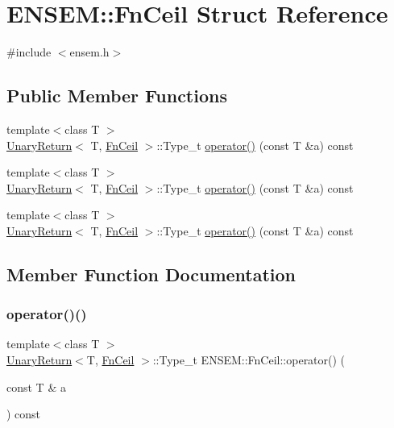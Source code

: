 \hypertarget{structENSEM_1_1FnCeil}{}\section{E\+N\+S\+EM\+:\+:Fn\+Ceil Struct Reference}
\label{structENSEM_1_1FnCeil}


{\ttfamily \#include $<$ensem.\+h$>$}

\subsection*{Public Member Functions}
\begin{DoxyCompactItemize}
\item 
{\footnotesize template$<$class T $>$ }\\\mbox{\hyperlink{structENSEM_1_1UnaryReturn}{Unary\+Return}}$<$ T, \mbox{\hyperlink{structENSEM_1_1FnCeil}{Fn\+Ceil}} $>$\+::Type\+\_\+t \mbox{\hyperlink{structENSEM_1_1FnCeil_acaee8f3349fe23a961345ed93b8c7bc4}{operator()}} (const T \&a) const
\item 
{\footnotesize template$<$class T $>$ }\\\mbox{\hyperlink{structENSEM_1_1UnaryReturn}{Unary\+Return}}$<$ T, \mbox{\hyperlink{structENSEM_1_1FnCeil}{Fn\+Ceil}} $>$\+::Type\+\_\+t \mbox{\hyperlink{structENSEM_1_1FnCeil_acaee8f3349fe23a961345ed93b8c7bc4}{operator()}} (const T \&a) const
\item 
{\footnotesize template$<$class T $>$ }\\\mbox{\hyperlink{structENSEM_1_1UnaryReturn}{Unary\+Return}}$<$ T, \mbox{\hyperlink{structENSEM_1_1FnCeil}{Fn\+Ceil}} $>$\+::Type\+\_\+t \mbox{\hyperlink{structENSEM_1_1FnCeil_acaee8f3349fe23a961345ed93b8c7bc4}{operator()}} (const T \&a) const
\end{DoxyCompactItemize}


\subsection{Member Function Documentation}
\mbox{\label{structENSEM_1_1FnCeil_acaee8f3349fe23a961345ed93b8c7bc4}} 
\subsubsection{\texorpdfstring{operator()()}{operator()()}\hspace{0.1cm}{\footnotesize\ttfamily [1/3]}}
{\footnotesize\ttfamily template$<$class T $>$ \\
\mbox{\hyperlink{structENSEM_1_1UnaryReturn}{Unary\+Return}}$<$T, \mbox{\hyperlink{structENSEM_1_1FnCeil}{Fn\+Ceil}} $>$\+::Type\+\_\+t E\+N\+S\+E\+M\+::\+Fn\+Ceil\+::operator() (\begin{DoxyParamCaption}\item[{const T \&}]{a }\end{DoxyParamCaption}) const\hspace{0.3cm}{\ttfamily [inline]}}

